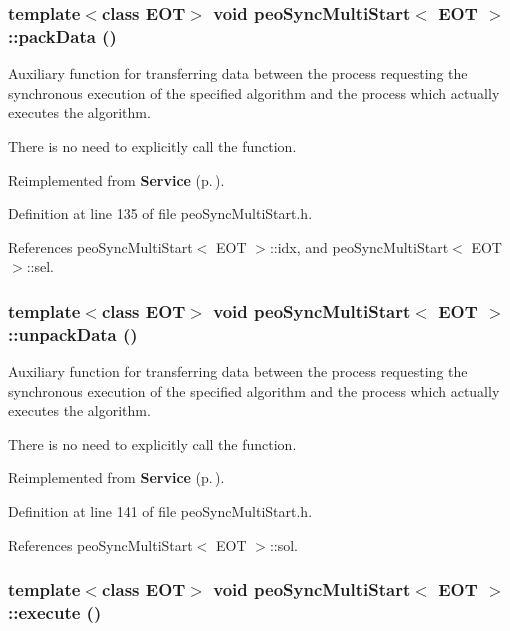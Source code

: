 \subsubsection{\setlength{\rightskip}{0pt plus 5cm}template$<$class EOT$>$ void {\bf peo\-Sync\-Multi\-Start}$<$ EOT $>$::pack\-Data ()\hspace{0.3cm}{\tt  [virtual]}}\label{classpeo_sync_multi_start_8becfab1922b64708dca5a53e2932a5a}


Auxiliary function for transferring data between the process requesting the synchronous execution of the specified algorithm and the process which actually executes the algorithm. 

There is no need to explicitly call the function. 

Reimplemented from {\bf Service} {\rm (p.\,\pageref{class_service_aea4b8f7f8fb88e83862ee4bfd9ab207})}.

Definition at line 135 of file peo\-Sync\-Multi\-Start.h.

References peo\-Sync\-Multi\-Start$<$ EOT $>$::idx, and peo\-Sync\-Multi\-Start$<$ EOT $>$::sel.
\subsubsection{\setlength{\rightskip}{0pt plus 5cm}template$<$class EOT$>$ void {\bf peo\-Sync\-Multi\-Start}$<$ EOT $>$::unpack\-Data ()\hspace{0.3cm}{\tt  [virtual]}}\label{classpeo_sync_multi_start_2903a441b77cded266b5fb651e17a5b5}


Auxiliary function for transferring data between the process requesting the synchronous execution of the specified algorithm and the process which actually executes the algorithm. 

There is no need to explicitly call the function. 

Reimplemented from {\bf Service} {\rm (p.\,\pageref{class_service_3bd87b444710813d30fd754d4d0b4df3})}.

Definition at line 141 of file peo\-Sync\-Multi\-Start.h.

References peo\-Sync\-Multi\-Start$<$ EOT $>$::sol.
\subsubsection{\setlength{\rightskip}{0pt plus 5cm}template$<$class EOT$>$ void {\bf peo\-Sync\-Multi\-Start}$<$ EOT $>$::execute ()\hspace{0.3cm}{\tt  [virtual]}}\label{classpeo_sync_multi_start_a4d1c2943c290de540800087b54dc49b}



